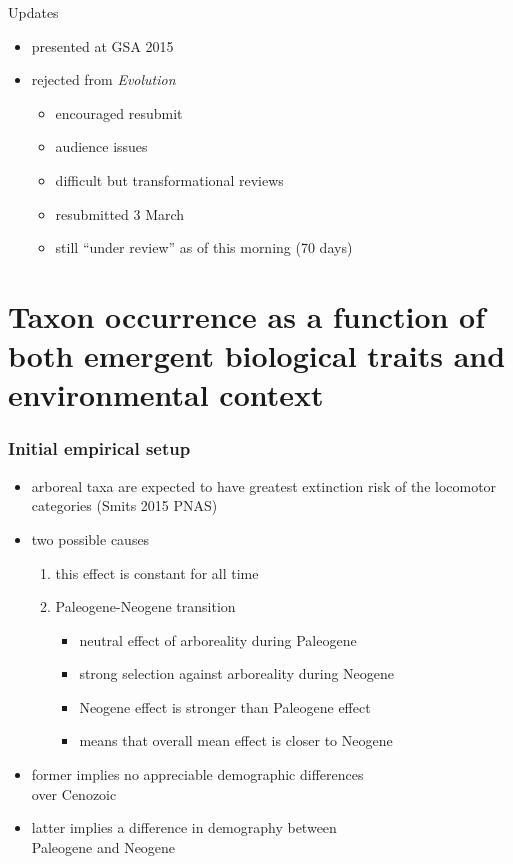 \documentclass{beamer}
\begin{document}
\begin{frame}
  \begin{alertblock}{Updates}
    \begin{itemize}
      \item presented at GSA 2015
      \item rejected from \textit{Evolution}
        \begin{itemize}
          \item encouraged resubmit
          \item audience issues
          \item difficult but transformational reviews
          \item resubmitted 3 March
          \item still ``under review'' as of this morning (70 days)
        \end{itemize}
    \end{itemize}
  \end{alertblock}
\end{frame}



\section{Taxon occurrence as a function of both emergent biological traits and environmental context}

\begin{frame}
  \frametitle{Initial empirical setup}
  \begin{itemize}
    \item arboreal taxa are expected to have greatest extinction risk of the locomotor categories (Smits 2015 PNAS)
    \item two possible causes
      \begin{enumerate}
        \item this effect is constant for all time
        \item Paleogene-Neogene transition
          \begin{itemize}
            \item neutral effect of arboreality during Paleogene
            \item strong selection against arboreality during Neogene
            \item Neogene effect is stronger than Paleogene effect
            \item means that overall mean effect is closer to Neogene
          \end{itemize}
      \end{enumerate}
    \item former implies no appreciable demographic differences \\over Cenozoic
    \item latter implies a difference in demography between \\Paleogene and Neogene
  \end{itemize}
\end{frame}
\end{document}
